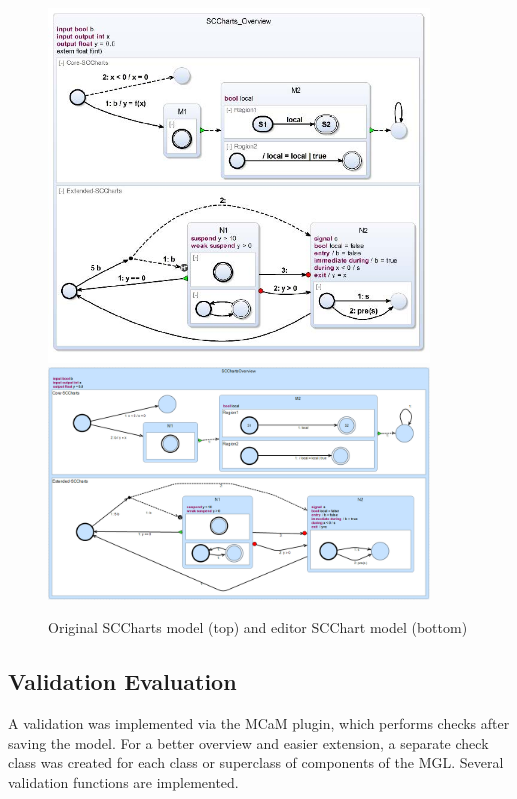 \begin{figure}[h!]
\centering
\includegraphics[width=0.9\textwidth]{bilder/SCCharts_Overview_Without_Declarations.jpg}
\includegraphics[width=0.9\textwidth]{bilder/CincoSCChartOverview.png}
\caption{Original SCCharts model (top) and editor SCChart model (bottom)}
\label{fig:SCChartOverview_Comparison}
\end{figure} 

\subsection{Validation Evaluation}

A validation was implemented via the MCaM plugin, which performs checks after saving the model. For a better overview and easier extension, a separate check class was created for each class or superclass of components of the MGL. Several validation functions are implemented.

